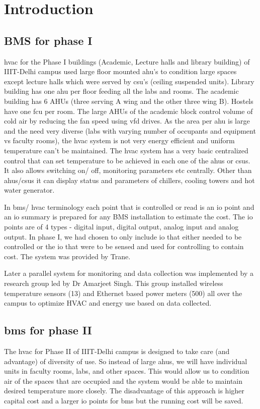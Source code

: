 \documentclass[letterpaper,11pt]{report}
\begin{document}
\newpage
\chapter{Introduction}\label{chapter:introduction}
\setcounter{page}{1}
\onehalfspacing
\section{BMS for phase I}
\ac{hvac} for the Phase I buildings (Academic, Lecture halls and library building) of IIIT-Delhi campus used large floor mounted \ac{ahu}'s to condition large spaces except lecture halls which were served by \ac{csu}'s (ceiling suspended units). Library building has one \ac{ahu} per floor feeding all the labs and rooms. The academic building has 6 AHUs (three serving A wing and the other three wing B). Hostels have one \ac{fcu} per room. The large AHUs of the academic block control volume of cold air by reducing the fan speed using \ac{vfd} drives. As the area per \ac{ahu} is large and the need very diverse (labs with varying number of occupants and equipment vs faculty rooms), the \ac{hvac} system is not very energy efficient and uniform temperature can't be maintained. The \ac{hvac} system has a very basic centralized control that can set temperature to be achieved in each one of the \ac{ahu}s or \ac{csu}s. It also allows switching on/ off, monitoring parameters etc centrally. Other than \ac{ahu}s/\ac{csu}s it can display status and parameters of chillers, cooling towers and hot water generator.
\par
In \ac{bms}/ \ac{hvac} terminology each point that is controlled or read is an \ac{io} point and an \ac{io} summary is prepared for any BMS installation to estimate the cost. The \ac{io} points are of 4 types - digital input, digital output, analog input and analog output. In phase I, we had chosen to only include \ac{io} that either needed to be controlled or the \ac{io} that were to be sensed and used for controlling to contain cost. The system was provided by Trane.
\par
Later a parallel system for monitoring and data collection was implemented by a research group led by Dr Amarjeet Singh. This group installed wireless temperature sensors (13) and Ethernet based power meters (500) all over the campus to optimize HVAC and energy use based on data collected.
\pagebreak
\section{\ac{bms} for phase II}
The \ac{hvac} for Phase II of IIIT-Delhi campus is designed to take care (and advantage) of diversity of use. So instead of large \ac{ahu}s, we will have individual units in faculty rooms, labs, and other spaces. This would allow us to condition air of the spaces that are occupied and the system would be able to maintain desired temperature more closely. The disadvantage of this approach is higher capital cost and a larger \ac{io} points for \ac{bms} but the running cost will be saved.
\end{document}
